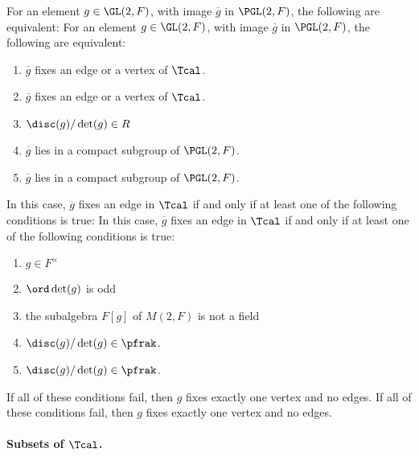 \documentclass[draft]{amsart}
\begin{document}
\begin{proposition}
    For an element $g\in \GL(2,F)$, with image $\overline{g}$ in $\PGL(2,F)$, the following are equivalent:
    For an element $g\in \GL(2,F)$, with image $\overline{g}$ in $\PGL(2,F)$, the following are equivalent:
    \begin{enumerate}
        \item $\overline{g}$ fixes an edge or a vertex of $\Tcal$.
        \item $\overline{g}$ fixes an edge or a vertex of $\Tcal$.
        \item $\disc(g)/\det(g) \in R$
        \item $\overline{g}$ lies in a compact subgroup of $\PGL(2,F)$.
        \item $\overline{g}$ lies in a compact subgroup of $\PGL(2,F)$.
    \end{enumerate}
    In this case, $\overline{g}$ fixes an edge in $\Tcal$ if and only if at least one of the following conditions is true:
    In this case, $\overline{g}$ fixes an edge in $\Tcal$ if and only if at least one of the following conditions is true:
    \begin{enumerate}
        \item $g \in F^\times$
        \item $\ord \det (g)$ is odd
        \item the subalgebra $F[g]$ of $M(2,F)$ is not a field
        \item $\disc(g)/\det(g) \in \pfrak$.
        \item $\disc(g)/\det(g) \in \pfrak$.
    \end{enumerate}
    If all of these conditions fail, then $g$ fixes exactly one vertex and no edges.
    If all of these conditions fail, then $g$ fixes exactly one vertex and no edges.
\end{proposition}


\paragraph*{Subsets of $\Tcal$.}
\end{document}
